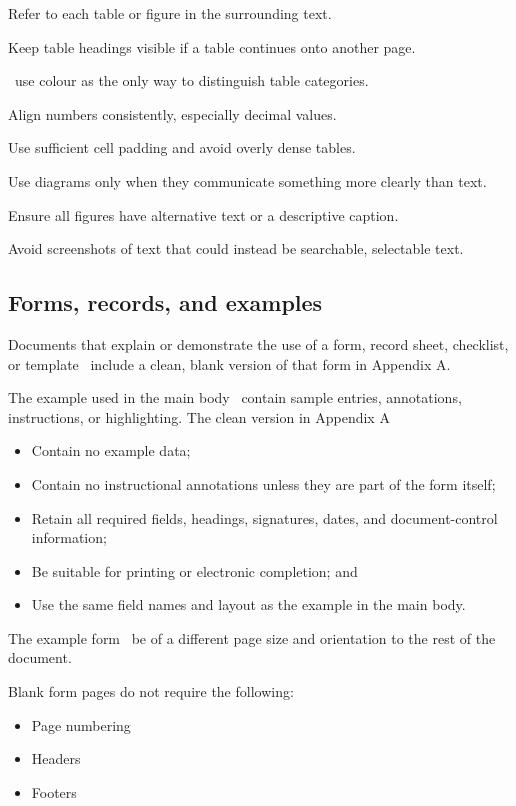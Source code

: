 Refer to each table or figure in the surrounding text.

Keep table headings visible if a table continues onto another page.

\donot~use colour as the only way to distinguish table categories.

Align numbers consistently, especially decimal values.

Use sufficient cell padding and avoid overly dense tables.

Use diagrams only when they communicate something more clearly than text.

Ensure all figures have alternative text or a descriptive caption.

Avoid screenshots of text that could instead be searchable, selectable text.

\subsection{Forms, records, and examples}

Documents that explain or demonstrate the use of a form, record sheet, checklist, or template \must~include a clean, blank version of that form in Appendix A.

The example used in the main body \may~contain sample entries, annotations, instructions, or highlighting. The clean version in Appendix A \must\:
\begin{itemize}
    \item Contain no example data;
    \item Contain no instructional annotations unless they are part of the form itself;
    \item Retain all required fields, headings, signatures, dates, and document-control information;
    \item Be suitable for printing or electronic completion; and
    \item Use the same field names and layout as the example in the main body.
\end{itemize}

The example form \may~be of a different page size and orientation to the rest of the document.

Blank form pages do not require the following:
\begin{itemize}
    \item Page numbering
    \item Headers
    \item Footers
\end{itemize}

